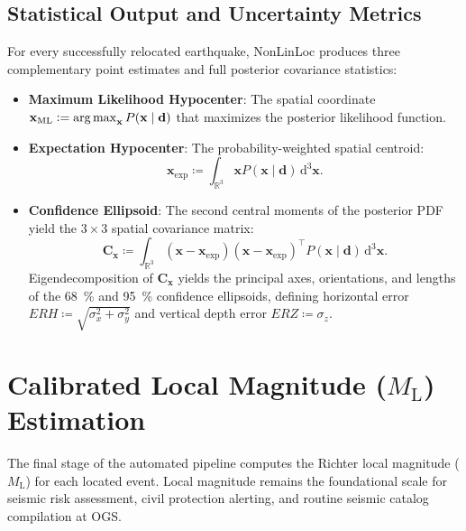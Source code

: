 \subsection{Statistical Output and Uncertainty Metrics}
For every successfully relocated earthquake, \ac{NonLinLoc} produces
three complementary point estimates and full posterior covariance statistics:
\begin{itemize}
  \item \textbf{Maximum Likelihood Hypocenter}: The spatial
    coordinate $\mathbf{x}_{\mathrm{ML}} \mathrel{\mathop:}= \operatorname{arg\,max}_{\mathbf{x}}
    P(\mathbf{x} \mid \mathbf{d})$
    that maximizes the posterior likelihood function.
  \item \textbf{Expectation Hypocenter}: The probability-weighted
    spatial centroid:
    \begin{equation}
      \mathbf{x}_{\mathrm{exp}} \coloneqq \int_{\mathbb{R}^3} \mathbf{x}
      P(\mathbf{x} \mid \mathbf{d}) \,\mathrm{d}^3\mathbf{x}.
    \end{equation}
  \item \textbf{Confidence Ellipsoid}: The second central moments of
    the posterior PDF yield the $3 \times 3$ spatial covariance matrix:
    \begin{equation}
      \mathbf{C}_{\mathbf{x}} \coloneqq \int_{\mathbb{R}^3} (\mathbf{x} -
      \mathbf{x}_{\mathrm{exp}})(\mathbf{x} -
      \mathbf{x}_{\mathrm{exp}})^\top P(\mathbf{x} \mid \mathbf{d})
      \,\mathrm{d}^3\mathbf{x}.
    \end{equation}
    Eigendecomposition of $\mathbf{C}_{\mathbf{x}}$ yields the
    principal axes, orientations, and lengths of the \qty{68}{\percent} and
    \qty{95}{\percent} confidence ellipsoids, defining horizontal error $ERH
    \coloneqq \sqrt{\sigma_x^2 + \sigma_y^2}$ and vertical depth error $ERZ
    \coloneqq \sigma_z$.
\end{itemize}

\section{Calibrated Local Magnitude
(\texorpdfstring{$M_{\mathrm{L}}$}{M L}) Estimation}
\label{sec:magnitude_estimation}

The final stage of the automated pipeline computes the Richter local
magnitude ($M_{\mathrm{L}}$) for each located event. Local magnitude remains
the foundational scale for seismic risk assessment, civil protection
alerting, and routine seismic catalog compilation at \ac{OGS}.

